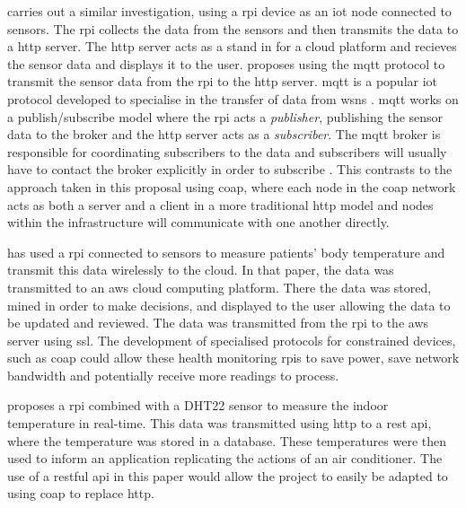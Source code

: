 \citet{rode_iot_2017} carries out a similar investigation, using a \gls{rpi} 
device as an \gls{iot} node connected to sensors. The \gls{rpi} collects the 
data from the sensors and then transmits the data to a \gls{http} server. 
The \gls{http} server acts as a stand in for a cloud platform and recieves
the sensor data and displays it to the user.
\citet{rode_iot_2017} proposes using the 
\gls{mqtt} protocol to transmit the sensor data from the \gls{rpi} to the
\gls{http} server.
\gls{mqtt} is a popular \gls{iot} protocol developed to specialise in the transfer
of data from \glspl{wsn} \citep{hunkeler_mqtt-s_2008}. \gls{mqtt} works on a 
publish/subscribe model where the \gls{rpi} acts a \textit{publisher}, 
publishing the sensor data to the broker and the \gls{http} server acts as a
\textit{subscriber}. The \gls{mqtt} broker is responsible for coordinating subscribers 
to the data and subscribers will usually have to contact the broker explicitly in 
order to subscribe \citep{hunkeler_mqtt-s_2008}.
This contrasts to the approach taken in this proposal using \gls{coap}, where each
node in the \gls{coap} network acts as both a server and a client in a more traditional
\gls{http} model and nodes within the infrastructure will communicate with one
another directly.

\citet{jassas_smart_2015} has used a \gls{rpi} connected to sensors to measure 
patients' body temperature and transmit this data wirelessly to the cloud.
In that paper, the data was transmitted to an \gls{aws} cloud computing platform.
There the data was stored, mined in order to make decisions, 
and displayed to the user allowing the data to be updated and reviewed.
The data was transmitted from the \gls{rpi} to the \gls{aws} server using \gls{ssl}.
The development of specialised protocols for constrained devices, such as \gls{coap}
could allow these health monitoring \glspl{rpi} to save power,
save network bandwidth and potentially receive more readings to process.

\citet{lee_internet_2018} proposes a \gls{rpi} combined with a DHT22 sensor to measure
the indoor temperature in real-time. This data was transmitted using \gls{http}
to a \gls{rest} \gls{api}, where the temperature was stored in a database.
These temperatures were then used to inform an application replicating 
the actions of an air conditioner. The use of a \gls{rest}ful \gls{api} in 
this paper would allow the project to easily be adapted to using \gls{coap} 
to replace \gls{http}.